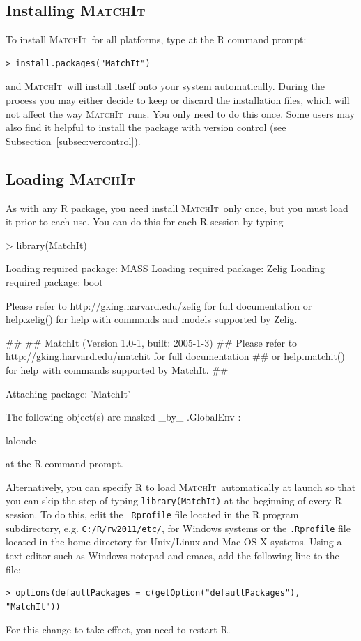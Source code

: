 \documentclass[oneside,letterpaper,titlepage]{article}
\newcommand{\MatchIt}{\textsc{MatchIt}}
\begin{document}
\subsection{Installing \MatchIt}
\label{subsec:install}

To install \MatchIt\ for all platforms, type at the R command prompt:
\begin{verbatim}
> install.packages("MatchIt")
\end{verbatim}
and \MatchIt\ will install itself onto your system automatically.
During the process you may either decide to keep or discard the
installation files, which will not affect the way \MatchIt\ runs.  You
only need to do this once.  Some users may also find it helpful to
install the package with version control (see
Subsection~\ref{subsec:vercontrol}).

\subsection{Loading \MatchIt}
\label{subsec:load}

As with any R package, you need install \MatchIt\ only once, but you
must load it prior to each use.  You can do this for each R session by
typing

\begin{Schunk}
\begin{Sinput}
> library(MatchIt)
\end{Sinput}
\begin{Soutput}
Loading required package: MASS
Loading required package: Zelig
Loading required package: boot

Please refer to http://gking.harvard.edu/zelig for full documentation 
or help.zelig() for help with commands and models supported by Zelig.

## 
##  MatchIt (Version 1.0-1, built: 2005-1-3)
##  Please refer to http://gking.harvard.edu/matchit for full documentation 
##  or help.matchit() for help with commands supported by MatchIt.
##

Attaching package: 'MatchIt'


	The following object(s) are masked _by_ .GlobalEnv :

	 lalonde 
\end{Soutput}
\end{Schunk}
at the R command prompt.  

Alternatively, you can specify R to load \MatchIt\ automatically at
launch so that you can skip the step of typing {\tt library(MatchIt)}
at the beginning of every R session.  To do this, edit the {\tt
  Rprofile} file located in the R program subdirectory, e.g.
\texttt{C:/R/rw2011/etc/}, for Windows systems or the {\tt .Rprofile}
file located in the home directory for Unix/Linux and Mac OS X
systems.  Using a text editor such as Windows notepad and emacs, add
the following line to the file:
\begin{verbatim}
> options(defaultPackages = c(getOption("defaultPackages"), "MatchIt"))
\end{verbatim}
For this change to take effect, you need to restart R.
\end{document}
